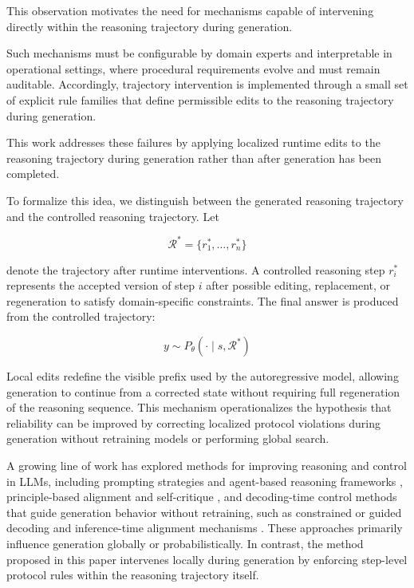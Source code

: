 \documentclass[twocolumn]{article}
\begin{document}
This observation motivates the need for mechanisms capable of intervening
directly within the reasoning trajectory during generation.

Such mechanisms must be configurable by domain experts and interpretable in
operational settings, where procedural requirements evolve and must remain
auditable. Accordingly, trajectory intervention is implemented through a small
set of explicit rule families that define permissible edits to the reasoning
trajectory during generation.

This work addresses these failures by applying localized runtime edits to the
reasoning trajectory during generation rather than after generation has been
completed.

To formalize this idea, we distinguish between the generated reasoning
trajectory and the controlled reasoning trajectory. Let

\[
  \mathcal{R}^* = \{ r_1^*, \dots, r_n^* \}
\]

denote the trajectory after runtime interventions. A controlled reasoning step
$r_i^*$ represents the accepted version of step $i$ after possible editing,
replacement, or regeneration to satisfy domain-specific constraints. The final
answer is produced from the controlled trajectory:

\[
  y \sim P_\theta(\cdot \mid s, \mathcal{R}^*)
\]

Local edits redefine the visible prefix used by the autoregressive model,
allowing generation to continue from a corrected state without requiring full
regeneration of the reasoning sequence. This mechanism operationalizes the
hypothesis that reliability can be improved by correcting localized protocol
violations during generation without retraining models or performing global
search.

A growing line of work has explored methods for improving reasoning and control
in LLMs, including prompting strategies and agent-based reasoning frameworks
\parencite{wei2022cot,yao2023react,yao2023treeofthoughts,shinn2023reflexion},
principle-based alignment and self-critique \parencite{bai2022constitutionalai},
and decoding-time control methods that guide generation behavior without
retraining, such as constrained or guided decoding and inference-time alignment
mechanisms
\parencite{yang2021fudge,shi2023contextawaredecoding,srivatsa2024deal}. These
approaches primarily influence generation globally or probabilistically. In
contrast, the method proposed in this paper intervenes locally during generation
by enforcing step-level protocol rules within the reasoning trajectory itself.
\end{document}

